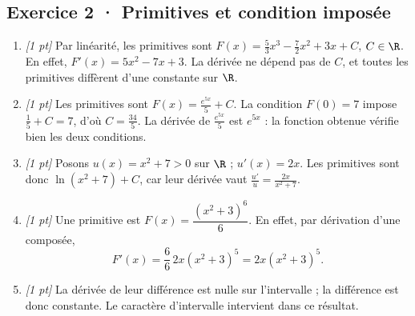 \subsection*{Exercice 2 · Primitives et condition imposée}\begin{enumerate}

\item \textit{[1 pt]} Par linéarité, les primitives sont $F(x)=\frac{5}{3}x^3-\frac{7}{2}x^2+3x+C$, $C\in\R$. En effet, $F'(x)=5x^2-7x+3$. La dérivée ne dépend pas de $C$, et toutes les primitives diffèrent d'une constante sur $\R$.

\item \textit{[1 pt]} Les primitives sont $F(x)=\frac{e^{5x}}{5}+C$. La condition $F(0)=7$ impose $\frac{1}{5}+C=7$, d'où $C=\frac{34}{5}$. La dérivée de $\frac{e^{5x}}{5}$ est $e^{5x}$ : la fonction obtenue vérifie bien les deux conditions.

\item \textit{[1 pt]} Posons $u(x)=x^2+7>0$ sur $\R$ ; $u'(x)=2x$. Les primitives sont donc $\ln(x^2+7)+C$, car leur dérivée vaut $\frac{u'}{u}=\frac{2x}{x^2+7}$.

\item \textit{[1 pt]} Une primitive est $F(x)=\dfrac{(x^2+3)^{6}}{6}$. En effet, par dérivation d'une composée,
\[F'(x)=\frac{6}{6}\,2x(x^2+3)^{5}=2x(x^2+3)^{5}.\]

\item \textit{[1 pt]} La dérivée de leur différence est nulle sur l'intervalle ; la différence est donc constante. Le caractère d'intervalle intervient dans ce résultat.

\end{enumerate}

